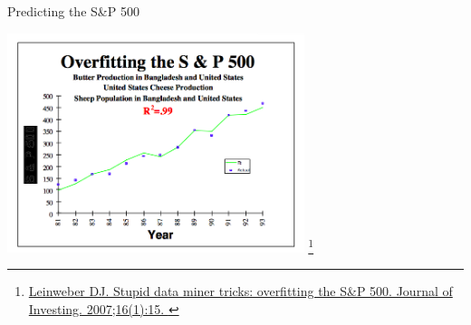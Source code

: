 \documentclass[aspectratio=169]{beamer}
\begin{document}
\begin{frame}{Predicting the S\&P 500}

\includegraphics[width=0.65\textwidth]{./lectReg/butter3.png}
\footnote{\url{Leinweber DJ. Stupid data miner tricks: overfitting the S&P 500. Journal of Investing. 2007;16(1):15.
}}
\end{frame}
\end{document}
